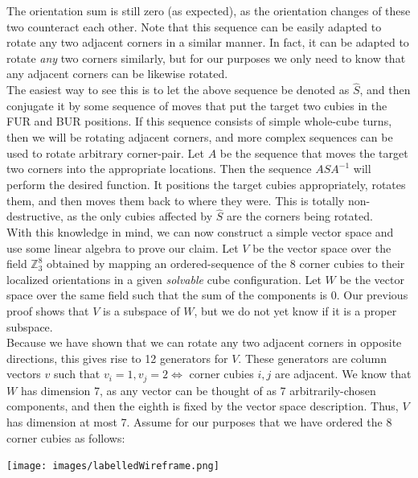 \documentclass[10pt,letterpaper]{report}
\begin{document}
The orientation sum is still zero (as expected), as the orientation changes of these two counteract each other.  Note that this sequence can be easily adapted to rotate any two adjacent corners in a similar manner.  In fact, it can be adapted to rotate \textit{any} two corners similarly, but for our purposes we only need to know that any adjacent corners can be likewise rotated. \\

The easiest way to see this is to let the above sequence be denoted as $\hat{S}$, and then conjugate it by some sequence of moves that put the target two cubies in the FUR and BUR positions.  If this sequence consists of simple whole-cube turns, then we will be rotating adjacent corners, and more complex sequences can be used to rotate arbitrary corner-pair.  Let $A$ be the sequence that moves the target two corners into the appropriate locations.  Then the sequence $A\hat{S}A^{-1}$ will perform the desired function.  It positions the target cubies appropriately, rotates them, and then moves them back to where they were.  This is totally non-destructive, as the only cubies affected by $\hat{S}$ are the corners being rotated. \\

With this knowledge in mind, we can now construct a simple vector space and use some linear algebra to prove our claim.  Let $V$ be the vector space over the field $\mathbb{Z}_3^8$ obtained by mapping an ordered-sequence of the 8 corner cubies to their localized orientations in a given \textit{solvable} cube configuration.   Let $W$ be the vector space over the same field such that the sum of the components is 0.  Our previous proof shows that $V$ is a subspace of $W$, but we do not yet know if it is a proper subspace. \\

Because we have shown that we can rotate any two adjacent corners in opposite directions, this gives rise to 12 generators for $V$.  These generators are column vectors $v$ such that $v_i = 1, v_j = 2 \Leftrightarrow $ corner cubies $i,j$ are adjacent.  We know that $W$ has dimension 7, as any vector can be thought of as 7 arbitrarily-chosen components, and then the eighth is fixed by the vector space description.  Thus, $V$ has dimension at most 7.  Assume for our purposes that we have ordered the 8 corner cubies as follows:

\begin{center}
\texttt{[image: images/labelledWireframe.png]} 
\end{center}
\end{document}
